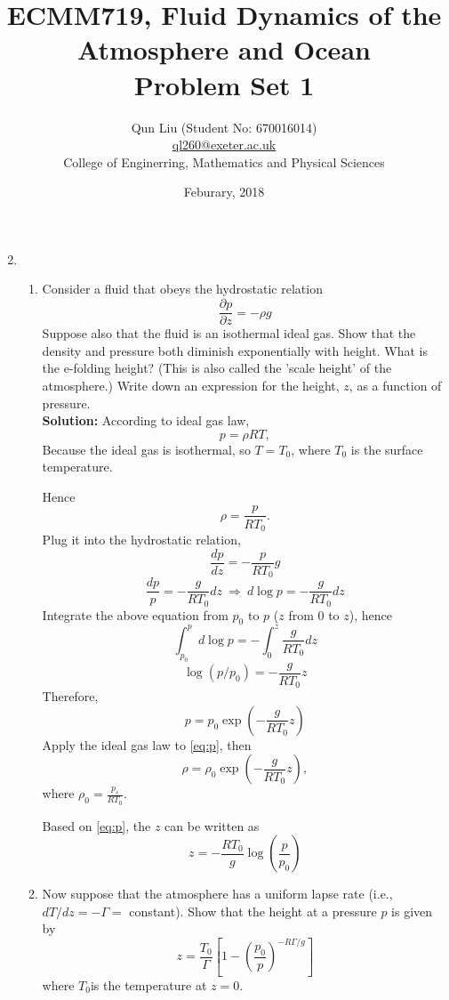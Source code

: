 \documentclass[a4paper]{article}
\title{ECMM719, Fluid Dynamics of the Atmosphere and Ocean\\
\textbf{Problem Set 1}}
\author{Qun Liu (Student No: 670016014)\\ \href{ql260@exeter.ac.uk}{ql260@exeter.ac.uk}
\\College of Enginerring, Mathematics and Physical Sciences}
\date{Feburary, 2018}
\begin{document}
\maketitle

\begin{enumerate}[label=\textbf{\arabic*.}]
	\setcounter{enumi}{1}
	\item 
		\begin{enumerate}[label=(\alph*)]%
			\setcounter{enumii}{0}
			\item Consider a fluid that obeys the hydrostatic relation
			$$\frac{\partial p}{\partial z}=-\rho g$$
			Suppose also that the fluid is an isothermal ideal gas. Show that the density and pressure both diminish exponentially with height. What is the e-folding height? (This is also called the 'scale height' of the atmosphere.) Write down
			an expression for the height, $z$, as a function of pressure.\\
			
			\textbf{Solution:} According to ideal gas law,
			\begin{equation}\label{eq:gas_law}
				p=\rho RT,
			\end{equation}
			Because the ideal gas is isothermal, so $T=T_0$, where $T_0$ is the surface temperature.
			
			Hence $$\rho = \frac{p}{RT_0}.$$
			Plug it into the hydrostatic relation, 
			$$\frac{d p}{d z}=-\frac{p}{RT_0}g$$
			$$\frac{d p}{p}=-\frac{g}{RT_0}dz ~ \Longrightarrow ~d \operatorname{log} p=-\frac{g}{RT_0}dz $$
			$$$$
			Integrate the above equation from $p_0$ to $p$ ($z$ from $0$ to $z$), hence
			$$\int_{p_0}^pd \operatorname{log} p=-\int_0^z \frac{g}{RT_0}dz$$
			$$\operatorname{log}{(p/p_0)}=-\frac{g}{RT_0}z$$
			Therefore,
			\begin{equation}\label{eq:p}
				p=p_0 \operatorname{exp}\left(-\frac{g}{RT_0}z\right)
			\end{equation}
			Apply the ideal gas law to \eqref{eq:p}, then
			\begin{equation}\label{eq:rho}
				\rho=\rho_0 \operatorname{exp}\left(-\frac{g}{RT_0}z\right),
			\end{equation}
			where $\rho_0 = \frac{p_s}{RT_0}$.
			
			Based on \eqref{eq:p}, the $z$ can be written as
			$$z=-\frac{RT_0}{g}\operatorname{log}\left(\frac{p}{p_0}\right)$$
			
			\item Now suppose that the atmosphere has a uniform lapse rate (i.e., $dT/dz=-\Gamma=$ constant). Show that the height at a pressure $p$ is given by
			$$z=\frac{T_0}{\Gamma}\left[1-\left(\frac{p_0}{p}\right)^{-R\Gamma/g}\right]$$
			where $T_0$is the temperature at $z = 0$.
			

\end{enumerate}
\end{enumerate}
\end{document}
